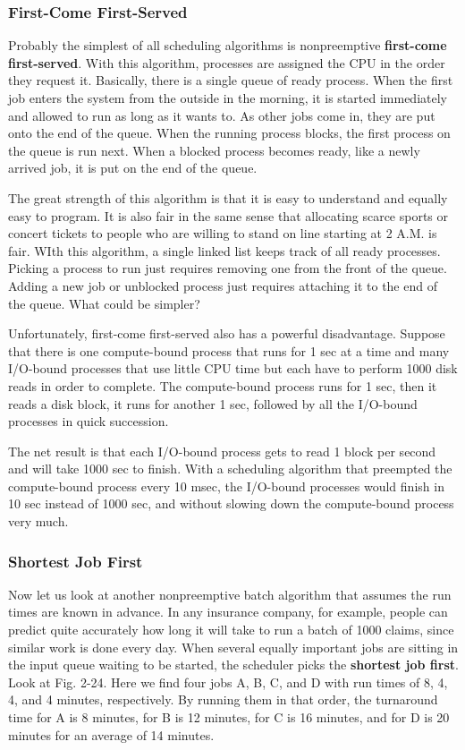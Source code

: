 \documentclass{book}
\newcommand {\kw}  [1] {\textbf{#1}}
\begin{document}
\subsubsection*{First-Come First-Served}
Probably the simplest of all scheduling algorithms is nonpreemptive \kw{first-come first-served}.
With this algorithm, processes are assigned the CPU in the order they request it.
Basically, there is a single queue of ready process.
When the first job enters the system from the outside in the morning, 
it is started immediately and allowed to run as long as it wants to.
As other jobs come in, they are put onto the end of the queue.
When the running process blocks, the first process on the queue is run next.
When a blocked process becomes ready, like a newly arrived job, it is put on the end of the queue.

The great strength of this algorithm is that it is easy to understand and equally easy to program.
It is also fair in the same sense that allocating scarce sports or concert tickets to people 
who are willing to stand on line starting at 2 A.M. is fair.
WIth this algorithm, a single linked list keeps track of all ready processes.
Picking a process to run just requires removing one from the front of the queue.
Adding a new job or unblocked process just requires attaching it to the end of the queue.
What could be simpler?

Unfortunately, first-come first-served also has a powerful disadvantage.
Suppose that there is one compute-bound process that runs for 1 sec at a time and 
many I/O-bound processes that use little CPU time but each have to perform 1000 disk reads in order to complete.
The compute-bound process runs for 1 sec, then it reads a disk block, it runs for another 1 sec,
followed by all the I/O-bound processes in quick succession.

The net result is that each I/O-bound process gets to read 1 block per second and will take 1000 sec to finish.
With a scheduling algorithm that preempted the compute-bound process every 10 msec,
the I/O-bound processes would finish in 10 sec instead of 1000 sec,
and without slowing down the compute-bound process very much.

\subsubsection{Shortest Job First}
Now let us look at another nonpreemptive batch algorithm that assumes the run times are known in advance.
In any insurance company, for example, people can predict quite accurately how long it will take to run a batch of 1000 claims,
since similar work is done every day.
When several equally important jobs are sitting in the input queue waiting to be started, the scheduler picks the \kw{shortest job first}.
Look at Fig. 2-24.
Here we find four jobs A, B, C, and D with run times of 8, 4, 4, and 4 minutes, respectively.
By running them in that order, the turnaround time for A is 8 minutes, for B is 12 minutes, for C is 16 minutes, 
and for D is 20 minutes for an average of 14 minutes.
\end{document}
